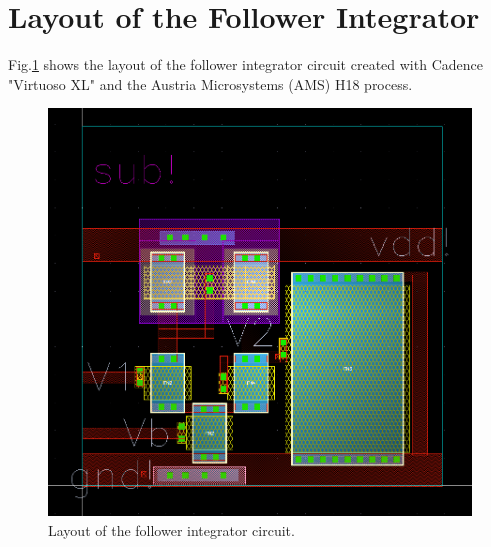 \section{Layout of the Follower Integrator}
Fig.\ref{fig:3} shows the layout of the follower integrator circuit created with Cadence "Virtuoso XL" and the Austria Microsystems (AMS) H18 process. 
\begin{figure}[!h]
	\includegraphics[width=\textwidth,height=\textheight,keepaspectratio]{layout.png}
	\caption{Layout of the follower integrator circuit.}
	\label{fig:3}
\end{figure}


